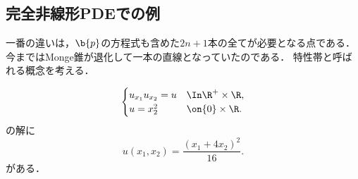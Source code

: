 \documentclass[uplatex,dvipdfmx]{jsreport}
\begin{document}
\subsection{完全非線形PDEでの例}

\begin{tcolorbox}[colframe=ForestGreen, colback=ForestGreen!10!white,breakable,colbacktitle=ForestGreen!40!white,coltitle=black,fonttitle=\bfseries\sffamily,
title=]
    一番の違いは，$\b{p}$の方程式も含めた$2n+1$本の全てが必要となる点である．
    今まではMonge錐が退化して一本の直線となっていたのである．
    特性帯と呼ばれる概念を考える．
\end{tcolorbox}

\begin{problem}[完全非線形PDEの特性方程式系]
    \[\begin{cases}
        u_{x_1}u_{x_2}=u&\In\R^+\times\R,\\
        u=x_2^2&\on\{0\}\times\R.
    \end{cases}\]
    の解に
    \[u(x_1,x_2)=\frac{(x_1+4x_2)^2}{16}.\]
    がある．
\end{problem}
\end{document}
